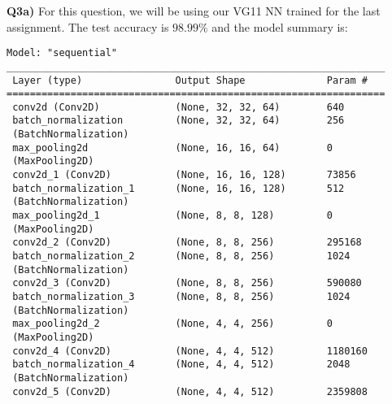 \documentclass{article}
\begin{document}
\begin{titlepage}
\vspace{0.5cm}
\textbf{Q3a)} For this question, we will be using our VG11 NN trained for the last assignment. The test accuracy is $98.99\%$ and the model summary is:
\begin{lstlisting}
Model: "sequential"
_________________________________________________________________
 Layer (type)                Output Shape              Param #   
=================================================================
 conv2d (Conv2D)             (None, 32, 32, 64)        640                                  
 batch_normalization         (None, 32, 32, 64)        256       
 (BatchNormalization)                                                                                        
 max_pooling2d               (None, 16, 16, 64)        0         
 (MaxPooling2D)                                                                                                                          
 conv2d_1 (Conv2D)           (None, 16, 16, 128)       73856                                                              
 batch_normalization_1       (None, 16, 16, 128)       512       
 (BatchNormalization)                                                                                                        
 max_pooling2d_1             (None, 8, 8, 128)         0         
 (MaxPooling2D)                                                                                                                    
 conv2d_2 (Conv2D)           (None, 8, 8, 256)         295168                                                          
 batch_normalization_2       (None, 8, 8, 256)         1024      
 (BatchNormalization)                                                    
 conv2d_3 (Conv2D)           (None, 8, 8, 256)         590080                                                            
 batch_normalization_3       (None, 8, 8, 256)         1024      
 (BatchNormalization)                                                                                                 
 max_pooling2d_2             (None, 4, 4, 256)         0         
 (MaxPooling2D)                                                            
 conv2d_4 (Conv2D)           (None, 4, 4, 512)         1180160                                                        
 batch_normalization_4       (None, 4, 4, 512)         2048      
 (BatchNormalization)                                                                                                            
 conv2d_5 (Conv2D)           (None, 4, 4, 512)         2359808                                                        

\end{lstlisting}
\end{titlepage}
\end{document}
